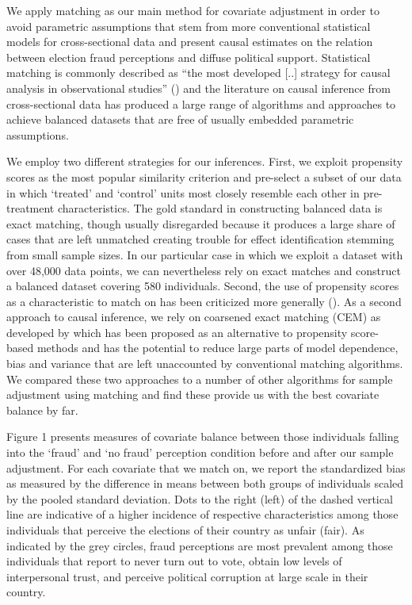 \documentclass[11pt, ngerman,english,a4]{article}
\begin{document}
We apply matching as our main method for covariate adjustment in order to avoid parametric assumptions that stem from more conventional statistical models for cross-sectional data and present causal estimates on the relation between election fraud perceptions and diffuse political support. Statistical matching is commonly described as “the most developed [..] strategy for causal analysis in observational studies” (\citealt{Pearl2010}) and the literature on causal inference from cross-sectional data has produced a large range of algorithms and approaches to achieve balanced datasets that are free of usually embedded  parametric assumptions. 

We employ two different strategies for our inferences. First, we exploit propensity scores as the most popular similarity criterion and pre-select a subset of our data in which `treated' and `control' units most closely resemble each other in pre-treatment characteristics. The gold standard in constructing balanced data is exact matching, though usually disregarded because it produces a large share of cases that are left unmatched creating trouble for effect identification stemming from small sample sizes. In our particular case in which we exploit a dataset with over 48,000 data points, we can nevertheless rely on exact matches and construct a balanced dataset covering 580 individuals. Second, the use of propensity scores as a characteristic to match on has been criticized more generally (\citealt{King2019}). As a second approach to causal inference, we rely on coarsened exact matching (CEM) as developed by \citet{Iacus2012} which has been proposed as an alternative to propensity score-based methods and has the potential to reduce large parts of model dependence, bias and variance that are left unaccounted by conventional matching algorithms. We compared these two approaches to a number of other algorithms for sample adjustment using matching and find these provide us with the best covariate balance by far. 

Figure 1 presents measures of covariate balance between those individuals falling into the `fraud' and `no fraud' perception condition before and after our sample adjustment. For each covariate that we match on, we report the standardized bias as measured by the difference in means between both groups of individuals scaled by the pooled standard deviation. Dots to the right (left) of the dashed vertical line are indicative of a higher incidence of respective characteristics among those individuals that perceive the elections of their country as unfair (fair). As indicated by the grey circles, fraud perceptions are most prevalent among those individuals that report to never turn out to vote, obtain low levels of interpersonal trust, and perceive political corruption at large scale in their country. 
\end{document}
